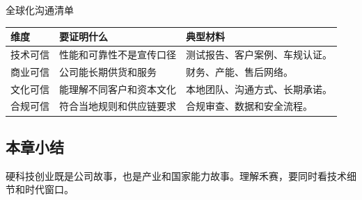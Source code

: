 \begin{knowledgebox}{全球化沟通清单}
\begin{tabularx}{\textwidth}{p{}p{}X}
\toprule
维度 & 要证明什么 & 典型材料 \\
\midrule
技术可信 & 性能和可靠性不是宣传口径 & 测试报告、客户案例、车规认证。 \\
商业可信 & 公司能长期供货和服务 & 财务、产能、售后网络。 \\
文化可信 & 能理解不同客户和资本文化 & 本地团队、沟通方式、长期承诺。 \\
合规可信 & 符合当地规则和供应链要求 & 合规审查、数据和安全流程。 \\
\bottomrule
\end{tabularx}
\end{knowledgebox}

\subsection{本章小结}

硬科技创业既是公司故事，也是产业和国家能力故事。理解禾赛，要同时看技术细节和时代窗口。

